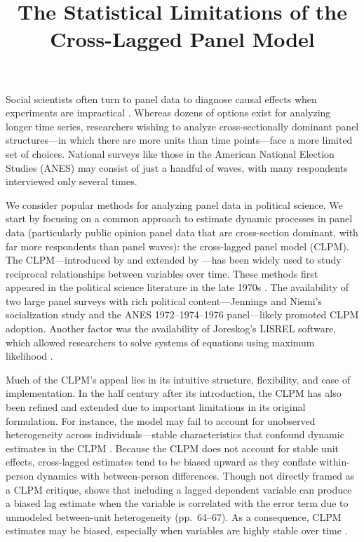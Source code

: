 \documentclass[12pt]{article}
\title{The Statistical Limitations of the Cross-Lagged Panel Model}
\author{}
\date{}
\begin{document}
\maketitle

Social scientists often turn to panel data to diagnose causal effects when experiments are impractical \cite{campbell_experimental_1963,campbell_1963}. Whereas dozens of options exist for analyzing longer time series, researchers wishing to analyze cross-sectionally dominant panel structures---in which there are more units than time points---face a more limited set of choices. National surveys like those in the American National Election Studies (ANES) may consist of just a handful of waves, with many respondents interviewed only several times.

We consider popular methods for analyzing panel data in political science. We start by focusing on a common approach to estimate dynamic processes in panel data (particularly public opinion panel data that are cross-section dominant, with far more respondents than panel waves): the cross-lagged panel model (CLPM). The CLPM---introduced by \cite{campbell_experimental_1963} and extended by \cite{kenny1975}---has been widely used to study reciprocal relationships between variables over time. These methods first appeared in the political science literature in the late 1970s \cite{abramowitz_impact_1978,campbell_style_1979,iyengar_testing_1978,jennings_effect_1977,markus_political_1979,markus_dynamic_1979,meier_issue_1979}. The availability of two large panel surveys with rich political content---Jennings and Niemi's socialization study \cite{jennings_political_1974} and the ANES 1972--1974--1976 panel---likely promoted CLPM adoption. Another factor was the availability of Joreskog's LISREL software, which allowed researchers to solve systems of equations using maximum likelihood \cite{markus_analyzing_1979,mccullough_effects_1978,shingles_causal_1976}.

Much of the CLPM's appeal lies in its intuitive structure, flexibility, and ease of implementation. In the half century after its introduction, the CLPM has also been refined and extended due to important limitations in its original formulation. For instance, the model may fail to account for unobserved heterogeneity across individuals---stable characteristics that confound dynamic estimates in the CLPM \cite{usami2015,usami2021,Klopack2020,Kim_Steiner2021}. Because the CLPM does not account for stable unit effects, cross-lagged estimates tend to be biased upward as they conflate within-person dynamics with between-person differences. Though not directly framed as a CLPM critique, \cite{hsiao2022} shows that including a lagged dependent variable can produce a biased lag estimate when the variable is correlated with the error term due to unmodeled between-unit heterogeneity (pp.~64--67). As a consequence, CLPM estimates may be biased, especially when variables are highly stable over time \cite{Hamaker2015,Hamaker2018,Ldtke2022}.
\end{document}
